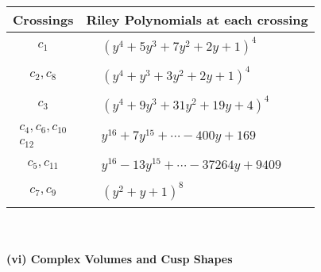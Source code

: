 \documentclass[1p]{elsarticle_modified}
\theoremstyle{definition}
\begin{document}
\begin{tabular}{m{50pt}|m{274pt}}
Crossings & \hspace{64pt}Riley Polynomials at each crossing \\
\hline $$\begin{aligned}c_{1}\end{aligned}$$&$\begin{aligned}
&(y^4+5 y^3+7 y^2+2 y+1)^4
\end{aligned}$\\
\hline $$\begin{aligned}c_{2},c_{8}\end{aligned}$$&$\begin{aligned}
&(y^4+y^3+3 y^2+2 y+1)^4
\end{aligned}$\\
\hline $$\begin{aligned}c_{3}\end{aligned}$$&$\begin{aligned}
&(y^4+9 y^3+31 y^2+19 y+4)^4
\end{aligned}$\\
\hline $$\begin{aligned}c_{4},c_{6},c_{10}\\c_{12}\end{aligned}$$&$\begin{aligned}
&y^{16}+7 y^{15}+\cdots-400 y+169
\end{aligned}$\\
\hline $$\begin{aligned}c_{5},c_{11}\end{aligned}$$&$\begin{aligned}
&y^{16}-13 y^{15}+\cdots-37264 y+9409
\end{aligned}$\\
\hline $$\begin{aligned}c_{7},c_{9}\end{aligned}$$&$\begin{aligned}
&(y^2+y+1)^8
\end{aligned}$\\
\hline
\end{tabular}\\~\\
\newpage\flushleft \textbf{(vi) Complex Volumes and Cusp Shapes}
\end{document}
